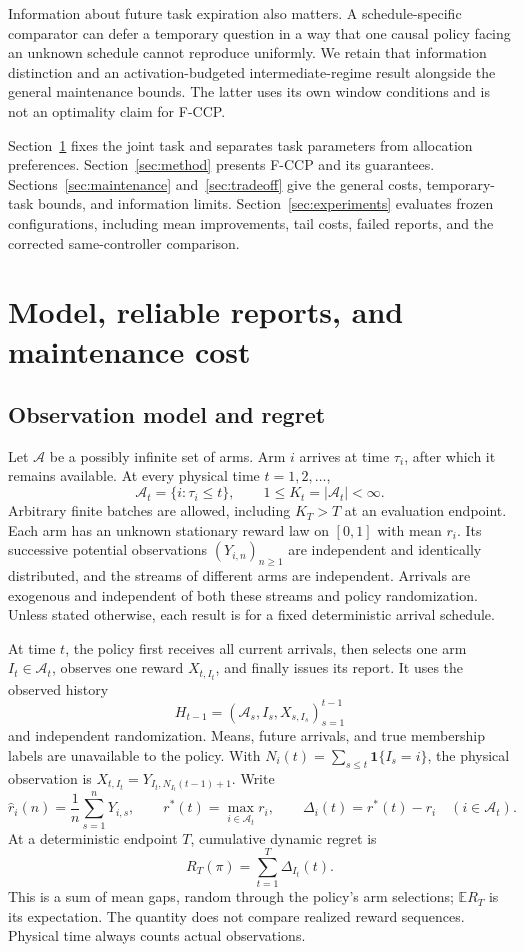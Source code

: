 \documentclass[11pt]{article}
\theoremstyle{remark}
\newcommand{\E}{\mathbb E}
\newcommand{\ind}{\mathbf 1}
\begin{document}
Information about future task expiration also matters. A schedule-specific
comparator can defer a temporary question in a way that one causal policy
facing an unknown schedule cannot reproduce uniformly. We retain that
information distinction and an activation-budgeted intermediate-regime
result alongside the general maintenance bounds. The latter uses its own
window conditions and is not an optimality claim for F-CCP.

Section~\ref{sec:model} fixes the joint task and separates task parameters
from allocation preferences. Section~\ref{sec:method} presents F-CCP and
its guarantees. Sections~\ref{sec:maintenance} and~\ref{sec:tradeoff}
give the general costs, temporary-task bounds, and information limits.
Section~\ref{sec:experiments} evaluates frozen configurations, including
mean improvements, tail costs, failed reports, and the corrected
same-controller comparison.
\section{Model, reliable reports, and maintenance cost}
\label{sec:model}
\label{sec:problem}

\subsection{Observation model and regret}

Let $\mathcal A$ be a possibly infinite set of arms. Arm $i$ arrives at
time $\tau_i$, after which it remains available. At every physical time
$t=1,2,\ldots$,
\[
 \mathcal A_t=\{i:\tau_i\le t\},\qquad
 1\le K_t=|\mathcal A_t|<\infty.
\]
Arbitrary finite batches are allowed, including $K_T>T$ at an evaluation
endpoint. Each arm has an unknown stationary reward law on $[0,1]$ with
mean $r_i$. Its successive potential observations $(Y_{i,n})_{n\ge1}$ are
independent and identically distributed, and the streams of different arms
are independent. Arrivals are exogenous and independent of both these
streams and policy randomization. Unless stated otherwise, each result
is for a fixed deterministic arrival schedule.

At time $t$, the policy first receives all current arrivals, then selects
one arm $I_t\in\mathcal A_t$, observes one reward $X_{t,I_t}$, and finally
issues its report. It uses the observed history
\[
 H_{t-1}=(\mathcal A_s,I_s,X_{s,I_s})_{s=1}^{t-1}
\]
and independent randomization. Means, future arrivals, and true membership
labels are unavailable to the policy. With
$N_i(t)=\sum_{s\le t}\ind\{I_s=i\}$, the physical observation is
$X_{t,I_t}=Y_{I_t,N_{I_t}(t-1)+1}$. Write
\[
 \hat r_i(n)=\frac1n\sum_{s=1}^nY_{i,s},\qquad
 r^*(t)=\max_{i\in\mathcal A_t}r_i,\qquad
 \Delta_i(t)=r^*(t)-r_i \quad(i\in\mathcal A_t).
\]
At a deterministic endpoint $T$, cumulative dynamic regret is
\[
 R_T(\pi)=\sum_{t=1}^{T}\Delta_{I_t}(t).
\]
This is a sum of mean gaps, random through the policy's arm selections;
$\E R_T$ is its expectation. The quantity does not compare realized
reward sequences. Physical time always counts actual observations.
\end{document}
